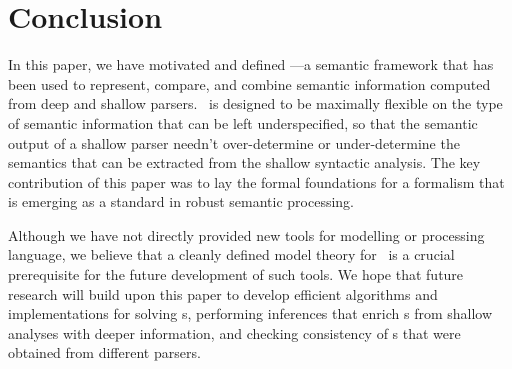 \section{Conclusion}
\label{sec:conclusion}

In this paper, we have motivated and defined \rmrs---a semantic
framework that has been used to represent, compare, and combine
semantic information computed from deep and shallow parsers.  \rmrs\
is designed to be maximally flexible on the type of semantic
information that can be left underspecified, so that the semantic
output of a shallow parser needn't over-determine or under-determine
the semantics that can be extracted from the shallow syntactic
analysis.  The key contribution of this paper was to lay the formal
foundations for a formalism that is emerging as a standard in robust
semantic processing.

Although we have not directly provided new tools for modelling or
processing language, we believe that a cleanly defined model theory
for \rmrs\ is a crucial prerequisite for the future development of
such tools.  We hope that future research will build upon this paper
to develop efficient algorithms and implementations for solving \rmrs
s, performing inferences that enrich \rmrs s from shallow analyses
with deeper information, and checking consistency of \rmrs s that were
obtained from different parsers.

